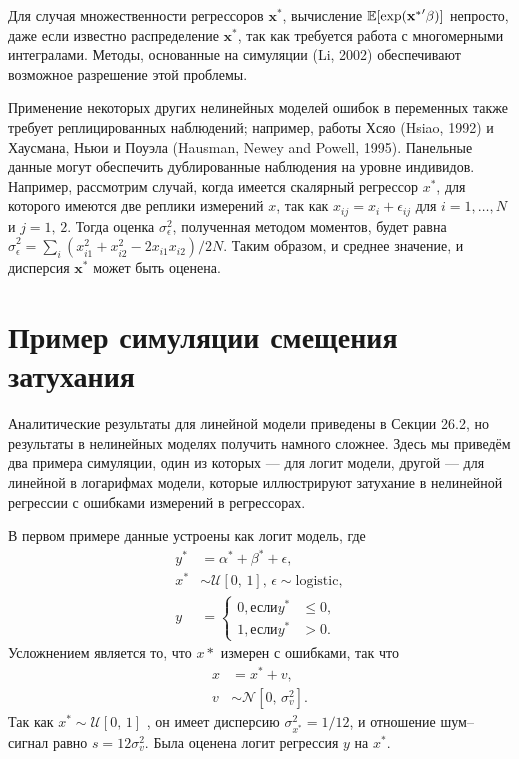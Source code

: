 Для случая множественности регрессоров $\mathbf{x^*}$, вычисление $\mathbb{E} [\exp (\mathbf{x^*}' \mathbf{\beta})]$ непросто, даже если известно распределение $\mathbf{x^*}$, так как требуется работа с многомерными интегралами. Методы, основанные на симуляции (Li, 2002) обеспечивают возможное разрешение этой проблемы.

Применение некоторых других нелинейных моделей ошибок в переменных также требует реплицированных наблюдений; например, работы Хсяо (Hsiao, 1992) и Хаусмана, Ньюи и Поуэла (Hausman, Newey and Powell, 1995). Панельные данные могут обеспечить дублированные наблюдения на уровне индивидов. Например, рассмотрим случай, когда имеется скалярный регрессор $x^*$, для которого имеются две реплики измерений $x$, так как $x_{ij} = x_i + \epsilon_{ij}$ для $i=1,\dots,N$ и $j=1, \, 2$. Тогда оценка $\sigma^2_{\epsilon}$, полученная методом моментов, будет равна $\widehat{\sigma}^2_{\epsilon} = \sum \limits_i (x^2_{i1}+x^2_{i2} - 2x_{i1}x_{i2})/2N$. Таким образом, и среднее значение, и дисперсия $\mathbf{x^*}$ может быть оценена.
 
\section{Пример симуляции смещения затухания} 
Аналитические результаты для линейной модели приведены в Секции 26.2, но результаты в нелинейных моделях получить намного сложнее. Здесь мы приведём два примера симуляции, один из которых --- для логит модели, другой --- для линейной в логарифмах модели, которые иллюстрируют затухание в нелинейной регрессии с ошибками измерений в регрессорах.

В первом примере данные устроены как логит модель, где
\begin{align*}
y^* &=\alpha^* + \beta^* + \epsilon, \\
x^* &\sim \mathcal{U}[0, \, 1], \, \epsilon \sim \text{logistic}, \\
y &= 
\begin{cases}
0, \text{если} y^* &\leqslant0 ,\\
1, \text{если} y^* &>0.
\end{cases}
\end{align*}
Усложнением является то, что $x*$ измерен с ошибками, так что
\begin{align*}
x &=x^*+v, \\
v &\sim \mathcal{N}[0, \, \sigma^2_v].
\end{align*}
Так как $x^* \sim \mathcal{U}[0, \, 1]$ , он имеет дисперсию $\sigma^2_{x^*}=1/12$, и отношение шум--сигнал равно $s=12\sigma^2_v$. Была оценена логит регрессия $y$ на $x^*$.

